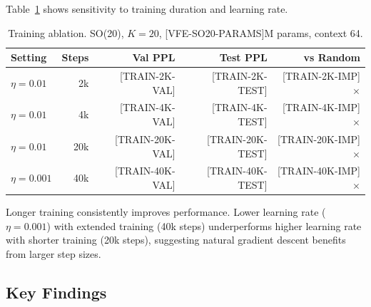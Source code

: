 \documentclass[twoside,11pt]{article}
\begin{document}
Table~\ref{tab:ablation_training} shows sensitivity to training duration and learning rate.

\begin{table}[h]
\centering
\small
\caption{Training ablation. SO(20), $K=20$, [VFE-SO20-PARAMS]M params, context 64.}
\label{tab:ablation_training}
\begin{tabular}{lrrrr}
\toprule
\textbf{Setting} & \textbf{Steps} & \textbf{Val PPL} & \textbf{Test PPL} & \textbf{vs Random} \\
\midrule
$\eta = 0.01$ & 2k & [TRAIN-2K-VAL] & [TRAIN-2K-TEST] & [TRAIN-2K-IMP]$\times$ \\
$\eta = 0.01$ & 4k & [TRAIN-4K-VAL] & [TRAIN-4K-TEST] & [TRAIN-4K-IMP]$\times$ \\
$\eta = 0.01$ & 20k & [TRAIN-20K-VAL] & [TRAIN-20K-TEST] & [TRAIN-20K-IMP]$\times$ \\
$\eta = 0.001$ & 40k & [TRAIN-40K-VAL] & [TRAIN-40K-TEST] & [TRAIN-40K-IMP]$\times$ \\
\bottomrule
\end{tabular}
\end{table}

Longer training consistently improves performance. Lower learning rate ($\eta = 0.001$) with extended training (40k steps) underperforms higher learning rate with shorter training (20k steps), suggesting natural gradient descent benefits from larger step sizes.

\subsection{Key Findings}
\end{document}

